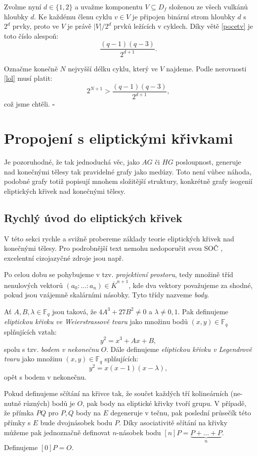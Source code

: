 \documentclass[12pt]{report}
\begin{document}
Zvolme nyní $d \in \lbrace 1,2 \rbrace$ a uvažme komponentu $V \subseteq D_f$ složenou ze všech vulkánů hloubky $d$. Ke každému členu cyklu $v \in V$ je připojen binární strom hloubky $d$ s $2^d$ prvky, proto ve $V$ je právě $\vert V \vert/2^d$ prvků ležících v cyklech. Díky větě \ref{pocetv} je toto číslo alespoň:
$$\frac{(q-1)(q-3)}{2^{d+1}}.$$

Označme konečně $N$ nejvyšší délku cyklu, který ve $V$ najdeme. Podle nerovnosti \eqref{lol} musí platit:
$$2^{N+1} > \frac{(q-1)(q-3)}{2^{d+1}},$$
což jsme chtěli. \hfill $\square$\\ 




\chapter{Propojení s eliptickými křivkami}\label{ctyri}

Je pozoruhodné, že tak jednoduchá věc, jako $AG$ či $HG$ posloupnost, generuje nad konečnými tělesy tak pravidelné grafy jako medúzy. Toto není vůbec náhoda, podobné grafy totiž popisují mnohem složitější struktury, konkrétně grafy isogenií eliptických křivek nad konečnými tělesy.

\section{Rychlý úvod do eliptických křivek}
V této sekci rychle a svižně probereme základy teorie eliptických křivek nad konečnými tělesy. Pro podrobnější text nemohu nedoporučit svou SOČ \cite{Pezlar}, excelentní cizojazyčné zdroje jsou např. \cite{Sutherland,Washington,Suchanek}

Po celou dobu se pohybujeme v tzv. \textit{projektivní prostoru}, tedy množině tříd nenulových vektorů $(a_0: \dots: a_n) \in \overline{K}^{n+1}$, kde dva vektory považujeme za shodné, pokud jsou vzájemně skalárními násobky. Tyto třídy nazveme \textit{body}.


\begin{definice}
Ať $A,B,\lambda \in \mathbb{F}_q$ jsou taková, že $4 A^3 + 27 B^2 \neq 0$ a $\lambda \neq 0, 1.$ Pak definujeme \textit{eliptickou křivku ve Weierstrassově tvaru} jako množinu bodů $(x,y) \in \mathbb{F}_q$ splňujících vztah:
$$y^2 = x^3 + Ax + B,$$
spolu s tzv. \textit{bodem v nekonečnu} $O$. Dále definujeme \textit{eliptickou křivku v Legendrově tvaru} jako množinu $(x,y) \in \mathbb{F}_q$ splňujících:
$$y^2 = x(x-1)(x-\lambda),$$
opět s bodem v nekonečnu.
\end{definice}
Pokud definujeme sčítání na křivce tak, že součet každých tří kolineárních (ne-nutně různých) bodů je $O$, pak body na eliptické křivky tvoří grupu. V případě, že přímka $PQ$ pro $P,Q$ body na $E$ degeneruje v tečnu, pak poslední průsečík této přímky s $E$ bude dvojnásobek bodu $P$. Díky asociativitě sčítání na křivky můžeme pak jednoznačně definovat $n$-násobek bodu $[n]P = \underbrace{P+\dots+P}_{n}$. Definujeme $[0]P = O$.
\end{document}
